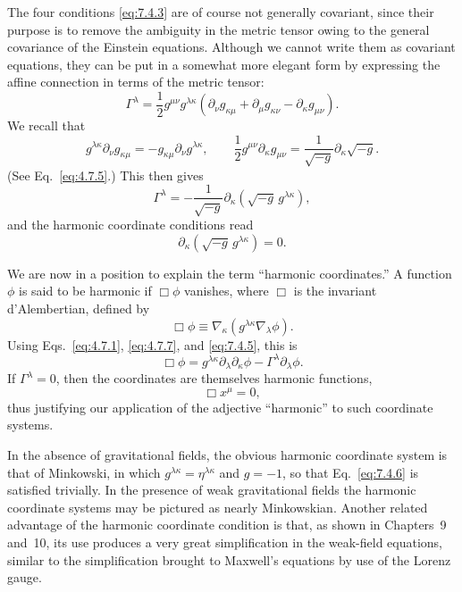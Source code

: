 The four conditions \eqref{eq:7.4.3} are of course not generally covariant,
since their purpose is to remove the ambiguity in the metric tensor owing to
the general covariance of the Einstein equations. Although we cannot write
them as covariant equations, they can be put in a somewhat more elegant form
by expressing the affine connection in terms of the metric tensor:
\[
  \Gamma^\lambda
  =
  \frac12g^{\mu\nu}g^{\lambda\kappa}
  \left(
    \partial_\nu g_{\kappa\mu}
    +\partial_\mu g_{\kappa\nu}
    -\partial_\kappa g_{\mu\nu}
  \right).
\]
We recall that
\[
  g^{\lambda\kappa}\partial_\nu g_{\kappa\mu}
  =
  -g_{\kappa\mu}\partial_\nu g^{\lambda\kappa},
  \qquad
  \frac12g^{\mu\nu}\partial_\kappa g_{\mu\nu}
  =
  \frac1{\sqrt{-g}}\partial_\kappa\sqrt{-g}.
\]
(See Eq.~\eqref{eq:4.7.5}.) This then gives
\begin{equation}
  \Gamma^\lambda
  =
  -\frac1{\sqrt{-g}}
  \partial_\kappa\left(\sqrt{-g}\,g^{\lambda\kappa}\right),
  \tag{7.4.5}\label{eq:7.4.5}
\end{equation}
and the harmonic coordinate conditions read
\begin{equation}
  \partial_\kappa\left(\sqrt{-g}\,g^{\lambda\kappa}\right)=0.
  \tag{7.4.6}\label{eq:7.4.6}
\end{equation}

We are now in a position to explain the term ``harmonic coordinates.'' A
function \(\phi\) is said to be harmonic if \(\Box\phi\) vanishes, where
\(\Box\) is the invariant d'Alembertian, defined by
\begin{equation}
  \Box\phi
  \equiv
  \nabla_\kappa\left(g^{\lambda\kappa}\nabla_\lambda\phi\right).
  \tag{7.4.7}\label{eq:7.4.7}
\end{equation}
Using Eqs.~\eqref{eq:4.7.1}, \eqref{eq:4.7.7}, and
\eqref{eq:7.4.5}, this is
\begin{equation}
  \Box\phi
  =
  g^{\lambda\kappa}\partial_\lambda\partial_\kappa\phi
  -\Gamma^\lambda\partial_\lambda\phi.
  \tag{7.4.8}\label{eq:7.4.8}
\end{equation}
If \(\Gamma^\lambda=0\), then the coordinates are themselves harmonic
functions,
\begin{equation}
  \Box x^\mu=0,
  \tag{7.4.9}\label{eq:7.4.9}
\end{equation}
thus justifying our application of the adjective ``harmonic'' to such
coordinate systems.

In the absence of gravitational fields, the obvious harmonic coordinate
system is that of Minkowski, in which \(g^{\lambda\kappa}=\eta^{\lambda\kappa}\)
and \(g=-1\), so that Eq.~\eqref{eq:7.4.6} is satisfied trivially. In the
presence of weak gravitational fields the harmonic coordinate systems may be
pictured as nearly Minkowskian. Another related advantage of the harmonic
coordinate condition is that, as shown in Chapters~9 and~10, its use produces
a very great simplification in the weak-field equations, similar to the
simplification brought to Maxwell's equations by use of the Lorenz gauge.
